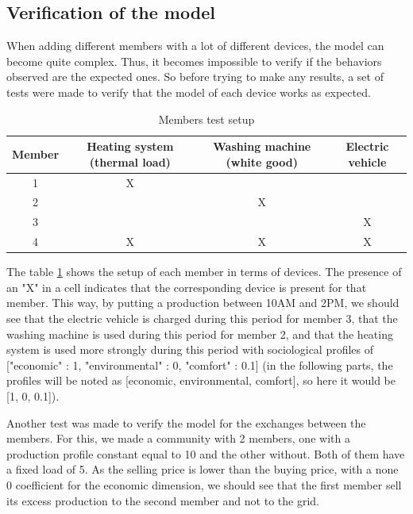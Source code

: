 \subsection{Verification of the model}

When adding different members with a lot of different devices, the model can become quite complex. Thus, it becomes impossible to verify if the behaviors observed are the expected ones. So before trying to make any results, a set of tests were made to verify that the model of each device works as expected.

\begin{table}[h!]
    \centering
    \begin{tabular}{|c|c|c|c|}
        \hline
        Member & Heating system (thermal load) & Washing machine (white good) & Electric vehicle \\ \hline
        1      & X  &    &    \\ \hline
        2      &   & X &     \\ \hline
        3      &   &  & X   \\ \hline
        4      & X   & X  & X   \\ \hline
    \end{tabular}
    \caption{Members test setup}
    \label{tab:test_members}
\end{table}

The table \ref{tab:test_members} shows the setup of each member in terms of devices. The presence of an "X" in a cell indicates that the corresponding device is present for that member. This way, by putting a production between 10AM and 2PM, we should see that the electric vehicle is charged during this period for member 3, that the washing machine is used during this period for member 2, and that the heating system is used more strongly during this period with sociological profiles of ["economic" : 1, "environmental" : 0, "comfort" : 0.1] (in the following parts, the profiles will be noted as [economic, environmental, comfort], so here it would be [1, 0, 0.1]).

Another test was made to verify the model for the exchanges between the members. For this, we made a community with 2 members, one with a production profile constant equal to 10 and the other without. Both of them have a fixed load of 5. As the selling price is lower than the buying price, with a none 0 coefficient for the economic dimension, we should see that the first member sell its excess production to the second member and not to the grid.

